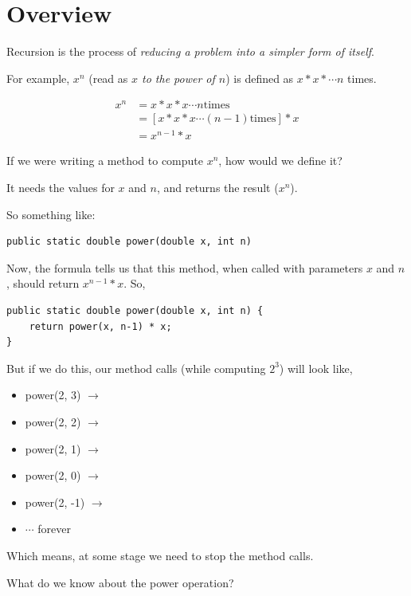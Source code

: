 \section{Overview}
Recursion is the process of \emph{reducing a problem into a simpler form of itself}.

For example, $x^n$ (read as \emph{$x$ to the power of $n$}) is defined as $x * x * \cdots n$ times.

\large
\begin{align*}
x^n&=x * x * x \cdots n \text{times}\\
       &=[x * x * x \cdots (n-1) \text{times}] * x\\
       &=x^{n-1} * x
\end{align*} 
\normalsize


If we were writing a method to compute $x^n$, how would we define it?

It needs the values for $x$ and $n$, and returns the result ($x^n$).

So something like:

\begin{lstlisting}
public static double power(double x, int n)
\end{lstlisting}

Now, the formula tells us that this method, when called with parameters $x$ and $n$, should return $x^{n-1} * x$. So,

\begin{lstlisting}
public static double power(double x, int n) {
	return power(x, n-1) * x;
}
\end{lstlisting}

But if we do this, our method calls (while computing $2^3$) will look like,

\begin{itemize}
\item power(2, 3) $\rightarrow$
\item power(2, 2) $\rightarrow$
\item power(2, 1) $\rightarrow$
\item power(2, 0) $\rightarrow$
\item power(2, -1) $\rightarrow$
\item $\cdots$ forever
\end{itemize}

\newpage

Which means, at some stage we need to stop the method calls.

What do we know about the power operation? 

